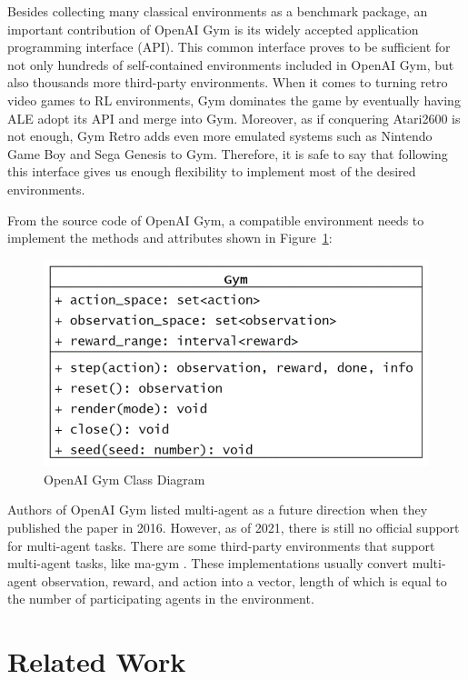 \documentclass[fyp]{socreport}
\begin{document}
Besides collecting many classical environments as a benchmark package, an important contribution of OpenAI Gym is its widely accepted application programming interface (API). This common interface proves to be sufficient for not only hundreds of self-contained environments included in OpenAI Gym, but also thousands more third-party environments. When it comes to turning retro video games to RL environments, Gym dominates the game by eventually having ALE adopt its API and merge into Gym. Moreover, as if conquering Atari2600 is not enough, Gym Retro \cite{gym-retro} adds even more emulated systems such as Nintendo Game Boy and Sega Genesis to Gym. Therefore, it is safe to say that following this interface gives us enough flexibility to implement most of the desired environments.

From the source code of OpenAI Gym, a compatible environment needs to implement the methods and attributes shown in Figure~\ref{fig:gym-class}:

\begin{figure}[htp]
    \centering
    \includegraphics{images/gym-class.png}
    \caption{OpenAI Gym Class Diagram}
    \label{fig:gym-class}
\end{figure}

Authors of OpenAI Gym listed multi-agent as a future direction when they published the paper in 2016. However, as of 2021, there is still no official support for multi-agent tasks. There are some third-party environments that support multi-agent tasks, like ma-gym \cite{magym}. These implementations usually convert multi-agent observation, reward, and action into a vector, length of which is equal to the number of participating agents in the environment.

\section{Related Work}
\end{document}
